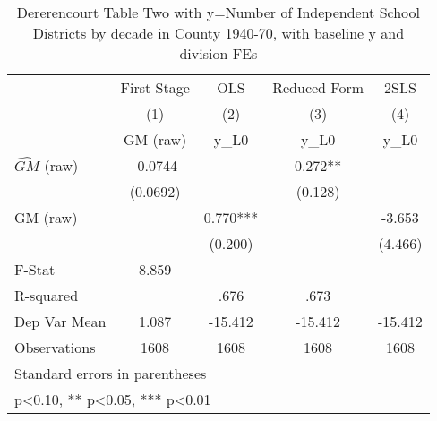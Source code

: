 \begin{table}[htbp]\centering
\def\sym#1{\ifmmode^{#1}\else\(^{#1}\)\fi}
\caption{Dererencourt Table Two with y=Number of Independent School Districts by decade in County 1940-70, with baseline y and division FEs}
\begin{tabular}{l*{4}{c}}
\toprule
                    & First Stage   &         OLS   &Reduced Form   &        2SLS   \\
                    &\multicolumn{1}{c}{(1)}&\multicolumn{1}{c}{(2)}&\multicolumn{1}{c}{(3)}&\multicolumn{1}{c}{(4)}\\
                    &\multicolumn{1}{c}{GM  (raw)}&\multicolumn{1}{c}{y\_L0}&\multicolumn{1}{c}{y\_L0}&\multicolumn{1}{c}{y\_L0}\\
\midrule
$\hat{GM}$ (raw)    &     -0.0744   &               &       0.272** &               \\
                    &    (0.0692)   &               &     (0.128)   &               \\
\addlinespace
GM  (raw)           &               &       0.770***&               &      -3.653   \\
                    &               &     (0.200)   &               &     (4.466)   \\
\midrule
F-Stat              &       8.859   &               &               &               \\
R-squared           &               &        .676   &        .673   &               \\
Dep Var Mean        &       1.087   &     -15.412   &     -15.412   &     -15.412   \\
Observations        &        1608   &        1608   &        1608   &        1608   \\
\bottomrule
\multicolumn{5}{l}{\footnotesize Standard errors in parentheses}\\
\multicolumn{5}{l}{\footnotesize * p<0.10, ** p<0.05, *** p<0.01}\\
\end{tabular}
\end{table}
